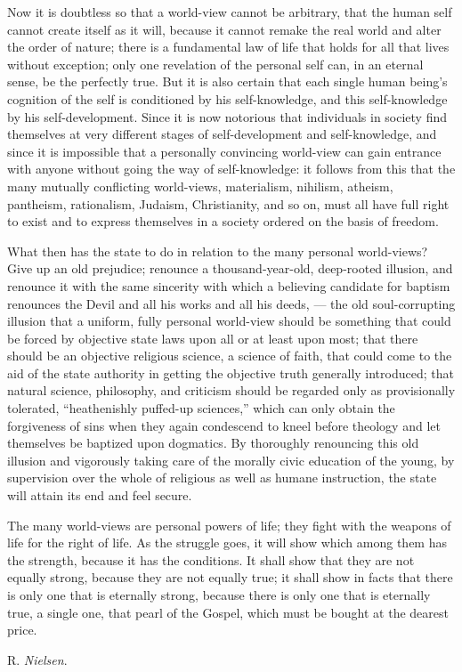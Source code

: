 \documentclass[12pt,a4paper,openany]{book}
\newcommand{\opage}[1]{\marginnote{\footnotesize\textit{[#1]}}}
\newcommand{\signature}[1]{\par\smallskip\hfill #1\hspace*{2em}\par}
\begin{document}
Now it is doubtless so that a world-view cannot
be arbitrary, that the human self cannot
create itself as it will, because it cannot remake the
real world and alter the order of nature; there is a
fundamental law of life that holds for all that lives without exception;
only one revelation of the personal self can,
in an eternal sense, be the perfectly true. But it
is also certain that each single human being's cognition of
the self is conditioned by his self-knowledge, and this self-knowledge
by his self-development. Since it is now notorious
that individuals in society find themselves at very
different stages of self-development and self-knowledge, and
since it is impossible that a personally convincing world-view
can gain entrance with anyone without going
the way of self-knowledge: it follows from this that the many
mutually conflicting world-views, materialism, nihilism,
atheism, pantheism, rationalism, Judaism,
\setcounter{footnote}{0}%
\opage{18}Christianity, and so on, must all have full right to exist
and to express themselves in a society ordered on the basis of freedom.

What then has the state to do in relation to the many personal
world-views? Give up an old
prejudice; renounce a thousand-year-old, deep-rooted illusion, and
renounce it with the same sincerity with which a believing
candidate for baptism renounces the Devil and all his works and all
his deeds, --- the old soul-corrupting illusion
that a uniform, fully personal world-view should
be something that could be forced by objective state laws upon
all or at least upon most; that there should be an objective
religious science, a science of faith, that could come
to the aid of the state authority in getting the objective
truth generally introduced; that natural science, philosophy, and
criticism should be regarded only as provisionally tolerated, ``heathenishly
puffed-up sciences,'' which can only obtain the forgiveness of
sins when they again condescend to
kneel before theology and let themselves be baptized upon dogmatics.
By thoroughly renouncing this old illusion and vigorously
taking care of the morally civic education of the young,
by supervision over the whole of religious as well as humane
instruction, the state will attain its end and feel secure.

The many world-views are personal powers of life;
they fight with the weapons of life for the right of life.
As the struggle goes, it will show which among
them has the strength, because it has the conditions.
It shall show that they are not equally strong, because they
are not equally true; it shall show in facts
that there is only one that is eternally strong, because
there is only one that is eternally true, a single one, that
pearl of the Gospel, which must be bought at the dearest price.
\signature{R. \emph{Nielsen}.}
\end{document}
